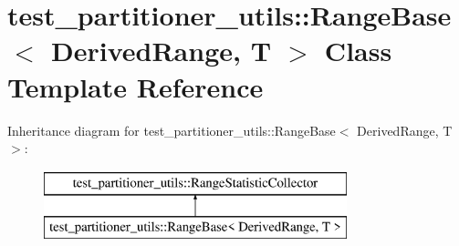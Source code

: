 \hypertarget{classtest__partitioner__utils_1_1RangeBase}{}\section{test\+\_\+partitioner\+\_\+utils\+:\+:Range\+Base$<$ Derived\+Range, T $>$ Class Template Reference}
\label{classtest__partitioner__utils_1_1RangeBase}
Inheritance diagram for test\+\_\+partitioner\+\_\+utils\+:\+:Range\+Base$<$ Derived\+Range, T $>$\+:\begin{figure}[H]
\begin{center}
\leavevmode
\includegraphics[height=2.000000cm]{classtest__partitioner__utils_1_1RangeBase}
\end{center}
\end{figure}
